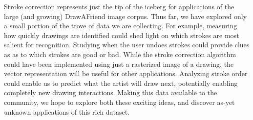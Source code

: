 Stroke correction represents just the tip of the iceberg for
applications of the large (and growing) DrawAFriend image corpus. Thus far, we have explored only a
small portion of the trove of data we are collecting. For example,
measuring how quickly drawings are identified could shed light on
which strokes are most salient for recognition. Studying when the
user undoes strokes could provide clues as as to which strokes are
good or bad. While the stroke correction algorithm could have been implemented using just a rasterized image of a drawing, the vector representation will be useful for other applications. Analyzing stroke order could enable us to predict what
the artist will draw next, potentially enabling completely new
drawing interactions. Making this data available to the community,
we hope to explore both these exciting ideas, and discover as-yet
unknown applications of this rich dataset.


%
%
%
%
%
%
%
%
% 	
%
%
%
%
%
